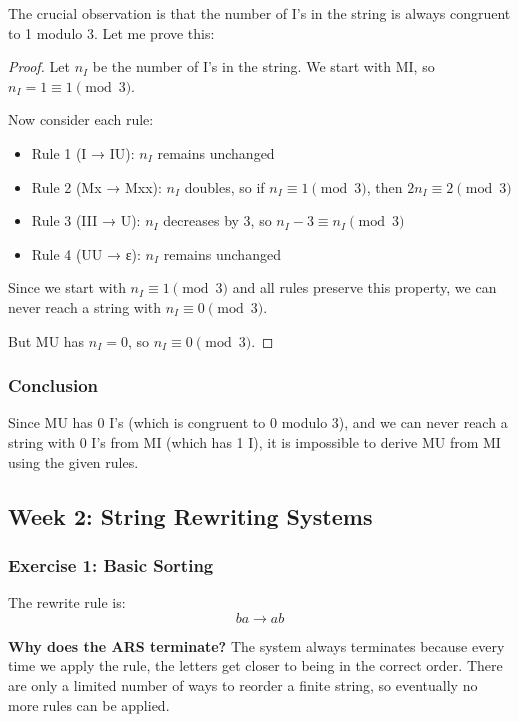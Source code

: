 \documentclass{article}
\theoremstyle{plain}
\theoremstyle{definition}
\theoremstyle{remark}
\begin{document}
The crucial observation is that the number of I's in the string is always congruent to 1 modulo 3. Let me prove this:

\begin{proof}
Let $n_I$ be the number of I's in the string. We start with MI, so $n_I = 1 \equiv 1 \pmod{3}$.

Now consider each rule:
\begin{itemize}
\item Rule 1 (I → IU): $n_I$ remains unchanged
\item Rule 2 (Mx → Mxx): $n_I$ doubles, so if $n_I \equiv 1 \pmod{3}$, then $2n_I \equiv 2 \pmod{3}$
\item Rule 3 (III → U): $n_I$ decreases by 3, so $n_I - 3 \equiv n_I \pmod{3}$
\item Rule 4 (UU → ε): $n_I$ remains unchanged
\end{itemize}

Since we start with $n_I \equiv 1 \pmod{3}$ and all rules preserve this property, we can never reach a string with $n_I \equiv 0 \pmod{3}$.

But MU has $n_I = 0$, so $n_I \equiv 0 \pmod{3}$.
\end{proof}

\subsubsection{Conclusion}

Since MU has 0 I's (which is congruent to 0 modulo 3), and we can never reach a string with 0 I's from MI (which has 1 I), it is impossible to derive MU from MI using the given rules.

\subsection{Week 2: String Rewriting Systems}

\subsubsection{Exercise 1: Basic Sorting}

The rewrite rule is:
\[
    ba \to ab
\]

\textbf{Why does the ARS terminate?}
The system always terminates because every time we apply the rule, the letters get closer to being in the correct order. There are only a limited number of ways to reorder a finite string, so eventually no more rules can be applied.
\end{document}
